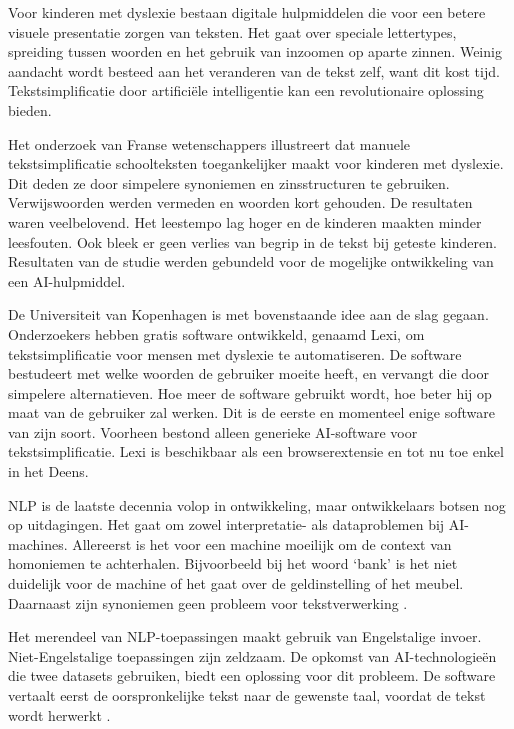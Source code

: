 Voor kinderen met dyslexie bestaan digitale hulpmiddelen die voor een betere visuele presentatie zorgen van teksten. Het gaat over speciale lettertypes, spreiding tussen woorden en het gebruik van inzoomen op aparte zinnen. Weinig aandacht wordt besteed aan het veranderen van de tekst zelf, want dit kost tijd. Tekstsimplificatie door artificiële intelligentie kan een revolutionaire oplossing bieden. 

Het onderzoek van Franse wetenschappers \textcite{Gala2016} illustreert dat manuele tekstsimplificatie schoolteksten toegankelijker maakt voor kinderen met dyslexie. Dit deden ze door simpelere synoniemen en zinsstructuren te gebruiken. Verwijswoorden werden vermeden en woorden kort gehouden. De resultaten waren veelbelovend. Het leestempo lag hoger en de kinderen maakten minder leesfouten. Ook bleek er geen verlies van begrip in de tekst bij geteste kinderen. Resultaten van de studie werden gebundeld voor de mogelijke ontwikkeling van een AI-hulpmiddel.

De Universiteit van Kopenhagen is met bovenstaande idee aan de slag gegaan. Onderzoekers \textcite{Bingel2018} hebben gratis software ontwikkeld, genaamd Lexi, om tekstsimplificatie voor mensen met dyslexie te automatiseren. De software bestudeert met welke woorden de gebruiker moeite heeft, en vervangt die door simpelere alternatieven. Hoe meer de software gebruikt wordt, hoe beter hij op maat van de gebruiker zal werken. Dit is de eerste en momenteel enige software van zijn soort. Voorheen bestond alleen generieke AI-software voor tekstsimplificatie. Lexi is beschikbaar als een browserextensie en tot nu toe enkel in het Deens. 

NLP is de laatste decennia volop in ontwikkeling, maar ontwikkelaars botsen nog op uitdagingen. Het gaat om zowel interpretatie- als dataproblemen bij AI-machines. Allereerst is het voor een machine moeilijk om de context van homoniemen te achterhalen. Bijvoorbeeld bij het woord ‘bank’ is het niet duidelijk voor de machine of het gaat over de geldinstelling of het meubel. Daarnaast zijn synoniemen geen probleem voor tekstverwerking \autocite{Roldos2020}.

Het merendeel van NLP-toepassingen maakt gebruik van Engelstalige invoer. Niet-Engelstalige toepassingen zijn zeldzaam. De opkomst van AI-technologieën die twee datasets gebruiken, biedt een oplossing voor dit probleem. De software vertaalt eerst de oorspronkelijke tekst naar de gewenste taal, voordat de tekst wordt herwerkt \autocite{Sciforce2020}.

